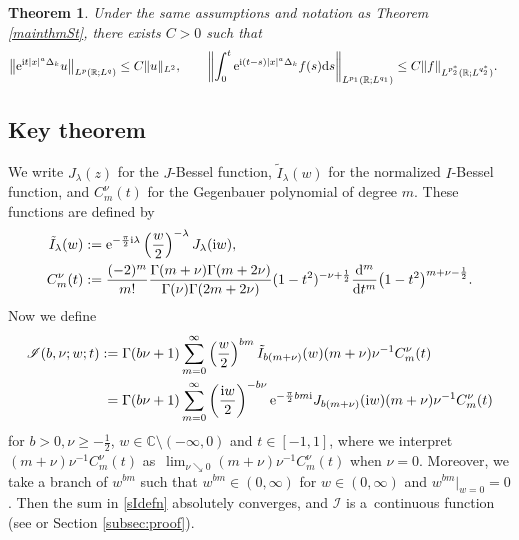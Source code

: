 \documentclass[pdftex]{sigma}
\numberwithin{equation}{section}
\newtheorem{Theorem}{Theorem}[section]
\def\R{\mathbb{R}}%
\def\l{\lambda}
\def\n{\nu}
\newcommand{\sI}{\mathscr{I}}
\begin{document}
\begin{Theorem}\label{coroSt}
Under the same assumptions and notation as Theorem {\rm\ref{mainthmSt}}, there exists $C>0$ such that
\begin{align*}
&\big\|{\rm e}^{{\rm i}t|x|^a\Delta_k}u\big\|_{L^p(\R; L^q)}\leq C\|u\|_{L^2},\qquad\left\|\int_{0}^t{\rm e}^{{\rm i}(t-s)|x|^a\Delta_k}f(s){\rm d}s \right\|_{L^{p_1}(\R; L^{q_1})} \leq C\|f\|_{L^{p_2^*}(\R; L^{q_2^*})}.
\end{align*}
\end{Theorem}

\subsection{Key theorem}
We write $J_{\lambda}(z)$ for the $J$-Bessel function, $\tilde{I}_{\lambda}(w)$ for the normalized $I$-Bessel function, and $C^{\nu}_m(t)$ for
the Gegenbauer polynomial of degree $m$.
These functions are defined by
\begin{align*}
\tilde{I}_{\lambda}(w):={}&{\rm e}^{-\frac{\pi}{2}{\rm i}\l}\left(\frac{w}{2}\right)^{-\l}J_{\l}({\rm i}w),\\
C^{\nu}_m(t):={}&\frac{(-2)^m}{m!}\frac{\Gamma(m+\nu)\Gamma(m+2\nu)}{\Gamma(\nu)\Gamma(2m+2\nu)}(1-t^2)^{-\nu+\frac{1}{2}}\frac{{\rm d}^m}{{\rm d}t^m}\bigl(1-t^2\bigr)^{m+\nu-\frac{1}{2}}.
\end{align*}
Now we define
\begin{align}\label{sIdefn}
\sI(b,\nu;w;t):={}&
\Gamma(b\nu+1)\sum_{m=0}^{\infty}\left(\frac{w}{2}\right)^{bm}\tilde{I}_{b(m+\nu)}(w)(m+\nu)\n^{-1}C^{\nu}_m(t)\\
={}&\Gamma(b\nu+1)\sum_{m=0}^{\infty}\left(\frac{{\rm i}w}{2}\right)^{-b\nu}{\rm e}^{-\frac{\pi}{2}bm {\rm i}}J_{b(m+\nu)}({\rm i}w)(m+\nu)\n^{-1}C^{\nu}_m(t)\notag
\end{align}
for $b>0,\n\geq -\frac{1}{2}$, $w\in\mathbb{C}\setminus (-\infty,0)$ and $t\in [-1,1]$, where we interpret $(m+\nu)\nu^{-1}C^{\nu}_m(t)$ as~${\lim_{\n\searrow 0}(m+\nu)\n^{-1}C^{\nu}_m(t)}$ when $\n=0$. Moreover, we take a branch of $w^{bm}$ such that $w^{bm}\in (0,\infty)$ for $w\in (0,\infty)$ and $w^{bm}|_{w=0}=0$.
Then the sum in \eqref{sIdefn} absolutely converges, and $\sI$ is a~continuous function (see \cite[Lemma 4.17\,(1)]{BKO} or Section \ref{subsec:proof}).
\end{document}
